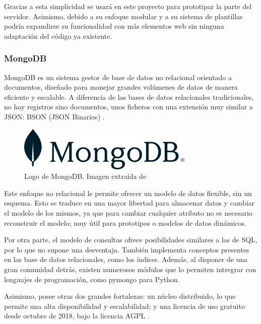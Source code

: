             Gracias a esta simplicidad se usará en este proyecto para prototipar la parte del servidor. Asimismo, debido a 
            su enfoque modular y a su sistema de plantillas podría expandirse su funcionalidad con más elementos web sin 
            ninguna adaptación del código ya existente.


        \subsubsection{MongoDB}
            MongoDB es un sistema gestor de base de datos no relacional orientado a documentos, diseñado para manejar 
            grandes volúmenes de datos de manera eficiente y escalable. A diferencia de las bases de datos relacionales 
            tradicionales, no hay registros sino documentos, unos ficheros con una extensión muy similar a JSON: BSON 
            (JSON Binarios) \cite{noauthor_json_nodate}. \newline

            \begin{figure}[h]
                \centering
                \includegraphics[width=0.75\textwidth]{figures/MongoDB logo.png}
                \caption[Logo de MongoDB.]
                {Logo de MongoDB. Imagen extraída de \cite{noauthor_mongodb_nodate}}
                \label{figure:mongodb:logo}
            \end{figure}


            Este enfoque no relacional le permite ofrecer un modelo de datos flexible, sin un esquema. Esto se traduce
            en una mayor libertad para almacenar datos y cambiar el modelo de los mismos, ya que para cambiar cualquier
            atributo no es necesario reconstruir el modelo; muy útil para prototipos o modelos de datos dinámicos.
            \newline

            Por otra parte, el modelo de consultas ofrece posibilidades similares a las de SQL, por lo que no supone
            una desventaja. También implementa conceptos presentes en las base de datos relacionales, como los índices. 
            Además, al disponer de una gran comunidad detrás, existen numerosos módulos que lo permiten
            intregrar con lenguajes de programación, como pymongo para Python. \newline

            Asimismo, posee otras dos grandes fortalezas: un núcleo distribuido, lo que permite una alta disponibilidad
            y escalabilidad; y una licencia de uso gratuito desde octubre de 2018, bajo la licencia AGPL 
            \cite{noauthor_que_nodate}.